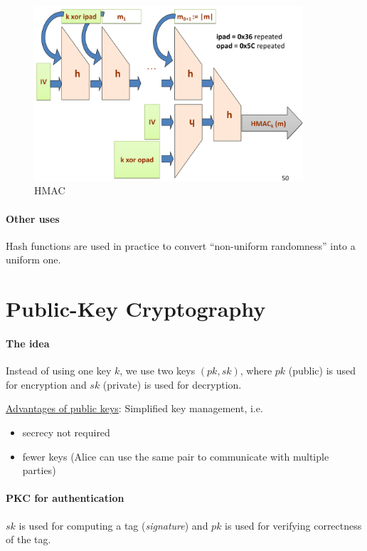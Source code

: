 \begin{figure}[h]
    \centering
    \includegraphics[width=10cm]{images/ch4-hmac.png}
    \caption{HMAC}
    \label{fig:hmac}
\end{figure}

\paragraph{Other uses} Hash functions are used in practice to convert “non-uniform randomness” into a uniform one.



%
%
\newpage
\section{Public-Key Cryptography}

\paragraph{The idea} Instead of using one key $k$, we use two keys $(pk, sk)$, where $pk$ (public) is used for encryption and $sk$ (private) is used for decryption.

\underline{Advantages of public keys}: Simplified key management, i.e.

\begin{itemize}
    \item secrecy not required
    \item fewer keys (Alice can use the same pair to communicate with multiple parties)
\end{itemize}

\paragraph{PKC for authentication} $sk$ is used for computing a tag (\textit{signature}) and $pk$ is used for verifying correctness of the tag. 

